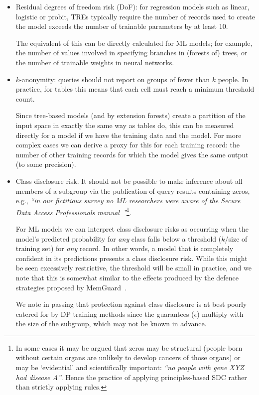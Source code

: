 \begin{itemize}
    \item Residual degrees of freedom risk (DoF): for regression models such as linear, logistic or probit, TREs typically require the number of records used to create the model exceeds the number of trainable parameters by at least 10.

        The equivalent of this can be directly calculated for ML models; for example, the number of values involved in specifying branches in (forests of) trees, or the number of trainable weights in neural networks.

    \item $k$-anonymity: queries should not report on groups of fewer than $k$ people. In practice, for tables this means that each cell must reach a minimum threshold count. 

        Since tree-based models (and by extension forests) create a partition of the input space in exactly the same way as tables do, this can be measured directly for a model if we have the training data and the model. For more complex cases we can derive a proxy for this for each training record: the number of other training records for which the model gives the same output (to some precision).

    \item Class disclosure risk. It should not be possible to make inference about all members of a subgroup via the publication of query results containing zeros, e.g., \textit{``in our fictitious survey no ML researchers were aware of the Secure Data Access Professionals manual~\cite{Griffiths:2019}''}\footnote{In some cases it may be argued that zeros may be structural (people born without certain organs are unlikely to develop cancers of those organs) or may be `evidential' and scientifically important: \textit{``no people with gene XYZ had disease A''}. Hence the practice of applying principles-based SDC rather than strictly applying rules.}.

        For ML models we can interpret class disclosure risks as occurring when the model's predicted probability for \textit{any} class falls below a threshold ($k$/size of training set) for \textit{any} record. In other words, a model that is completely confident in its predictions presents a class disclosure risk. While this might be seen excessively restrictive, the threshold will be small in practice, and we note that this is somewhat similar to the effects produced by the defence strategies proposed by MemGuard~\cite{memguard}. 

        We note in passing that protection against class disclosure is at best poorly catered for by DP training methods since the guarantees ($\epsilon$) multiply with the size of the subgroup, which may not be known in advance.
\end{itemize}
